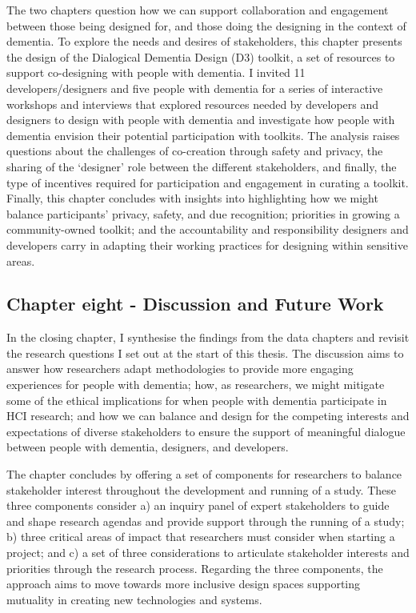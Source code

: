 The two chapters question how we can support collaboration and engagement between those being designed for, and those doing the designing in the context of dementia. To explore the needs and desires of stakeholders, this chapter presents the design of the Dialogical Dementia Design (D3) toolkit, a set of resources to support co-designing with people with dementia. I invited 11 developers/designers and five people with dementia for a series of interactive workshops and interviews that explored resources needed by developers and designers to design with people with dementia and investigate how people with dementia envision their potential participation with toolkits. The analysis raises questions about the challenges of co-creation through safety and privacy, the sharing of the ‘designer’ role between the different stakeholders, and finally, the type of incentives required for participation and engagement in curating a toolkit. Finally, this chapter concludes with insights into highlighting how we might balance participants' privacy, safety, and due recognition; priorities in growing a community-owned toolkit; and the accountability and responsibility designers and developers carry in adapting their working practices for designing within sensitive areas.
\subsection{Chapter eight - Discussion and Future Work}
\label{Intro:ChapterEight}
In the closing chapter, I synthesise the findings from the data chapters and revisit the research questions I set out at the start of this thesis. The discussion aims to answer how researchers adapt methodologies to provide more engaging experiences for people with dementia; how, as researchers, we might mitigate some of the ethical implications for when people with dementia participate in HCI research; and how we can balance and design for the competing interests and expectations of diverse stakeholders to ensure the support of meaningful dialogue between people with dementia, designers, and developers. 

The chapter concludes by offering a set of components for researchers to balance stakeholder interest throughout the development and running of a study. These three components consider a) an inquiry panel of expert stakeholders to guide and shape research agendas and provide support through the running of a study; b) three critical areas of impact that researchers must consider when starting a project; and c) a set of three considerations to articulate stakeholder interests and priorities through the research process. Regarding the three components, the approach aims to move towards more inclusive design spaces supporting mutuality in creating new technologies and systems.


